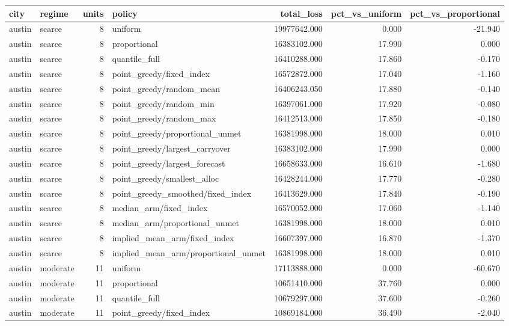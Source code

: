\begin{tabular}{llrlrrr}
\toprule
city & regime & units & policy & total\_loss & pct\_vs\_uniform & pct\_vs\_proportional \\
\midrule
austin & scarce & 8 & uniform & 19977642.000 & 0.000 & -21.940 \\
austin & scarce & 8 & proportional & 16383102.000 & 17.990 & 0.000 \\
austin & scarce & 8 & quantile\_full & 16410288.000 & 17.860 & -0.170 \\
austin & scarce & 8 & point\_greedy/fixed\_index & 16572872.000 & 17.040 & -1.160 \\
austin & scarce & 8 & point\_greedy/random\_mean & 16406243.050 & 17.880 & -0.140 \\
austin & scarce & 8 & point\_greedy/random\_min & 16397061.000 & 17.920 & -0.080 \\
austin & scarce & 8 & point\_greedy/random\_max & 16412513.000 & 17.850 & -0.180 \\
austin & scarce & 8 & point\_greedy/proportional\_unmet & 16381998.000 & 18.000 & 0.010 \\
austin & scarce & 8 & point\_greedy/largest\_carryover & 16383102.000 & 17.990 & 0.000 \\
austin & scarce & 8 & point\_greedy/largest\_forecast & 16658633.000 & 16.610 & -1.680 \\
austin & scarce & 8 & point\_greedy/smallest\_alloc & 16428244.000 & 17.770 & -0.280 \\
austin & scarce & 8 & point\_greedy\_smoothed/fixed\_index & 16413629.000 & 17.840 & -0.190 \\
austin & scarce & 8 & median\_arm/fixed\_index & 16570052.000 & 17.060 & -1.140 \\
austin & scarce & 8 & median\_arm/proportional\_unmet & 16381998.000 & 18.000 & 0.010 \\
austin & scarce & 8 & implied\_mean\_arm/fixed\_index & 16607397.000 & 16.870 & -1.370 \\
austin & scarce & 8 & implied\_mean\_arm/proportional\_unmet & 16381998.000 & 18.000 & 0.010 \\
austin & moderate & 11 & uniform & 17113888.000 & 0.000 & -60.670 \\
austin & moderate & 11 & proportional & 10651410.000 & 37.760 & 0.000 \\
austin & moderate & 11 & quantile\_full & 10679297.000 & 37.600 & -0.260 \\
austin & moderate & 11 & point\_greedy/fixed\_index & 10869184.000 & 36.490 & -2.040 \\

\end{tabular}
